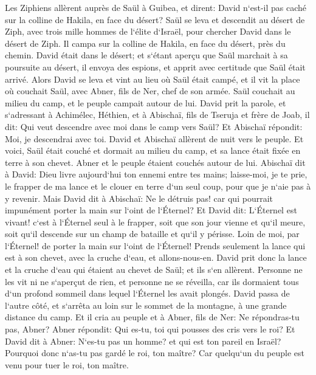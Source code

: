 \verse Les Ziphiens allèrent auprès de Saül à Guibea, et dirent: David n`est-il pas caché sur la colline de Hakila, en face du désert? 
\verse Saül se leva et descendit au désert de Ziph, avec trois mille hommes de l`élite d`Israël, pour chercher David dans le désert de Ziph. 
\verse Il campa sur la colline de Hakila, en face du désert, près du chemin. David était dans le désert; et s`étant aperçu que Saül marchait à sa poursuite au désert, 
\verse il envoya des espions, et apprit avec certitude que Saül était arrivé. 
\verse Alors David se leva et vint au lieu où Saül était campé, et il vit la place où couchait Saül, avec Abner, fils de Ner, chef de son armée. Saül couchait au milieu du camp, et le peuple campait autour de lui. 
\verse David prit la parole, et s`adressant à Achimélec, Héthien, et à Abischaï, fils de Tseruja et frère de Joab, il dit: Qui veut descendre avec moi dans le camp vers Saül? Et Abischaï répondit: Moi, je descendrai avec toi. 
\verse David et Abischaï allèrent de nuit vers le peuple. Et voici, Saül était couché et dormait au milieu du camp, et sa lance était fixée en terre à son chevet. Abner et le peuple étaient couchés autour de lui. 
\verse Abischaï dit à David: Dieu livre aujourd`hui ton ennemi entre tes mains; laisse-moi, je te prie, le frapper de ma lance et le clouer en terre d`un seul coup, pour que je n`aie pas à y revenir. 
\verse Mais David dit à Abischaï: Ne le détruis pas! car qui pourrait impunément porter la main sur l`oint de l`Éternel? 
\verse Et David dit: L`Éternel est vivant! c`est à l`Éternel seul à le frapper, soit que son jour vienne et qu`il meure, soit qu`il descende sur un champ de bataille et qu`il y périsse. 
\verse Loin de moi, par l`Éternel! de porter la main sur l`oint de l`Éternel! Prends seulement la lance qui est à son chevet, avec la cruche d`eau, et allons-nous-en. 
\verse David prit donc la lance et la cruche d`eau qui étaient au chevet de Saül; et ils s`en allèrent. Personne ne les vit ni ne s`aperçut de rien, et personne ne se réveilla, car ils dormaient tous d`un profond sommeil dans lequel l`Éternel les avait plongés. 
\verse David passa de l`autre côté, et s`arrêta au loin sur le sommet de la montagne, à une grande distance du camp. 
\verse Et il cria au peuple et à Abner, fils de Ner: Ne répondras-tu pas, Abner? Abner répondit: Qui es-tu, toi qui pousses des cris vers le roi? 
\verse Et David dit à Abner: N`es-tu pas un homme? et qui est ton pareil en Israël? Pourquoi donc n`as-tu pas gardé le roi, ton maître? Car quelqu`un du peuple est venu pour tuer le roi, ton maître. 
